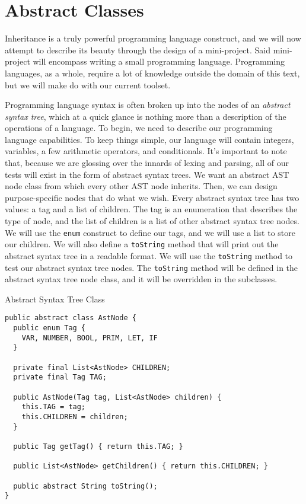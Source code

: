 \section{Abstract Classes}

\example Inheritance is a truly powerful programming language construct, and we will now attempt to describe its beauty through the design of a mini-project. Said mini-project will encompass writing a small programming language. Programming languages, as a whole, require a lot of knowledge outside the domain of this text, but we will make do with our current toolset.

Programming language syntax is often broken up into the nodes of an \textit{abstract syntax tree}, which at a quick glance is nothing more than a description of the operations of a language. To begin, we need to describe our programming language capabilities. To keep things simple, our language will contain integers, variables, a few arithmetic operators, and conditionals. It’s important to note that, because we are glossing over the innards of lexing and  parsing, all of our tests will exist in the form of abstract syntax trees. We want an abstract AST node class from which every other AST node inherits. Then, we can design purpose-specific nodes that do what we wish. Every abstract syntax tree has two values: a tag and a list of children. The tag is an enumeration that describes the type of node, and the list of children is a list of other abstract syntax tree nodes. We will use the \texttt{enum} construct to define our tags, and we will use a list to store our children. We will also define a \texttt{toString} method that will print out the abstract syntax tree in a readable format. We will use the \texttt{toString} method to test our abstract syntax tree nodes. The \texttt{toString} method will be defined in the abstract syntax tree node class, and it will be overridden in the subclasses.

\begin{cl}{Abstract Syntax Tree Class}
\begin{lstlisting}[language=MyJava]
public abstract class AstNode {
  public enum Tag {
    VAR, NUMBER, BOOL, PRIM, LET, IF
  }

  private final List<AstNode> CHILDREN;  
  private final Tag TAG;
 
  public AstNode(Tag tag, List<AstNode> children) {
    this.TAG = tag;
    this.CHILDREN = children;
  }

  public Tag getTag() { return this.TAG; }

  public List<AstNode> getChildren() { return this.CHILDREN; }

  public abstract String toString();
}
\end{lstlisting}
\end{cl}

